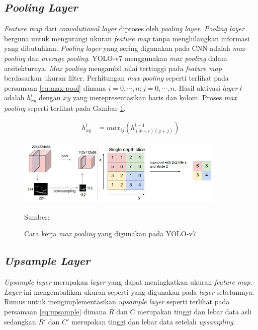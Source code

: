     \subsection{\textit{Pooling Layer}}
    \textit{Feature map} dari \textit{convolutional layer} diproses oleh \textit{pooling layer}. \textit{Pooling layer} berguna untuk mengurangi ukuran \textit{feature map} tanpa menghilangkan informasi yang dibutuhkan. \textit{Pooling layer} yang sering digunakan pada CNN adalah \textit{max pooling} dan \textit{average pooling}. YOLO-v7 menggunakan \textit{max pooling} dalam arsitekturnya. \textit{Max pooling} mengambil nilai tertinggi pada \textit{feature map} berdasarkan ukuran filter. Perhitungan \textit{max pooling} seperti terlihat pada persamaan \ref{eq:max-pool} dimana $i=0, \cdots, n;j=0, \cdots, n$. Hasil aktivasi \textit{layer} $l$ adalah $h^{l}_{xy}$ dengan $xy$ yang merepresentasikan baris dan kolom. Proses \textit{max pooling} seperti terlihat pada Gambar \ref{fig:max-pool}.

    \begin{align}
        \label{eq:max-pool}
        h^{l}_{xy} &= max_{ij}(h^{l-1}_{(x+i)(y+j)})
    \end{align}

    \begin{figure}[H]
        \centering
        \includegraphics[width=10cm]{../img/Max Pooling - Latex.png}
        \caption{Cara kerja \textit{max pooling} yang digunakan pada YOLO-v7}
        \label{fig:max-pool}
        Sumber: \citep{Yani2019}
    \end{figure}

    \subsection{\textit{Upsample Layer}}
    \textit{Upsample layer} merupakan \textit{layer} yang dapat meningkatkan ukuran \textit{feature map}. \textit{Layer} ini mengembalikan ukuran seperti yang digunakan pada \textit{layer} sebelumnya. Rumus untuk mengimplementasikan \textit{upsample layer} seperti terlihat pada persamaan \ref{eq:upsample} dimana $R$ dan $C$ merupakan tinggi dan lebar data asli sedangkan $R'$ dan $C'$ merupakan tinggi dan lebar data setelah \textit{upsampling}.

